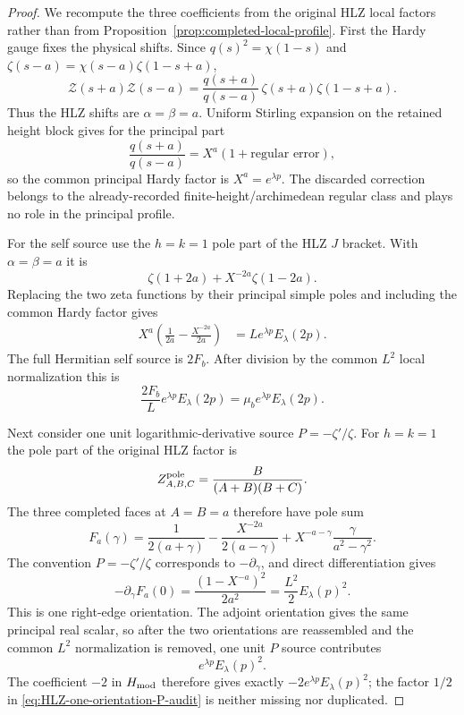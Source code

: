 \begin{proof}
We recompute the three coefficients from the original HLZ local factors rather
than from Proposition~\ref{prop:completed-local-profile}.  First the Hardy gauge
fixes the physical shifts.  Since $q(s)^2=\chi(1-s)$ and
$\zeta(s-a)=\chi(s-a)\zeta(1-s+a)$,
\begin{equation}
\mathscr Z(s+a)\mathscr Z(s-a)
=\frac{q(s+a)}{q(s-a)}\,
 \zeta(s+a)\zeta(1-s+a).
\label{eq:Hardy-HLZ-shift-identification}
\end{equation}
Thus the HLZ shifts are $\alpha=\beta=a$.  Uniform Stirling expansion on the
retained height block gives for the principal part
\[
\frac{q(s+a)}{q(s-a)}=X^a(1+\text{regular error}),
\]
so the common principal Hardy factor is
$X^a=e^{\lambda p}$.  The discarded correction belongs to the already-recorded
finite-height/archimedean regular class and plays no role in the principal
profile.

For the self source use the $h=k=1$ pole part of the HLZ $J$ bracket.  With
$\alpha=\beta=a$ it is
\[
\zeta(1+2a)+X^{-2a}\zeta(1-2a).
\]
Replacing the two zeta functions by their principal simple poles and including
the common Hardy factor gives
\begin{align*}
X^a\left(\frac1{2a}-\frac{X^{-2a}}{2a}\right)
&=L e^{\lambda p}E_\lambda(2p).
\end{align*}
The full Hermitian self source is $2F_b$.  After division by the common $L^2$
local normalization this is
\[
\frac{2F_b}{L}e^{\lambda p}E_\lambda(2p)
=\mu_b e^{\lambda p}E_\lambda(2p).
\]

Next consider one unit logarithmic-derivative source $P=-\zeta'/\zeta$.
For $h=k=1$ the pole part of the original HLZ factor is
\[
Z^{\rm pole}_{A,B,C}=\frac{B}{(A+B)(B+C)}.
\]
The three completed faces at $A=B=a$ therefore have pole sum
\begin{equation}
F_a(\gamma)
=\frac1{2(a+\gamma)}
 -\frac{X^{-2a}}{2(a-\gamma)}
 +X^{-a-\gamma}\frac{\gamma}{a^2-\gamma^2}.
\label{eq:HLZ-three-face-pole-sum-audit}
\end{equation}
The convention $P=-\zeta'/\zeta$ corresponds to $-\partial_\gamma$, and direct
differentiation gives
\begin{equation}
\boxed{
-\partial_\gamma F_a(0)
=\frac{(1-X^{-a})^2}{2a^2}
=\frac{L^2}{2}E_\lambda(p)^2.
}
\label{eq:HLZ-one-orientation-P-audit}
\end{equation}
This is one right-edge orientation.  The adjoint orientation gives the same
principal real scalar, so after the two orientations are reassembled and the
common $L^2$ normalization is removed, one unit $P$ source contributes
\[
e^{\lambda p}E_\lambda(p)^2.
\]
The coefficient $-2$ in $H_{\rm mod}$ therefore gives exactly
$-2e^{\lambda p}E_\lambda(p)^2$; the factor $1/2$ in
\eqref{eq:HLZ-one-orientation-P-audit} is neither missing nor duplicated.


\end{proof}
